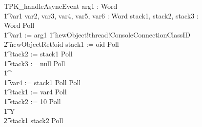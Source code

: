 \begin{figure}[tp!]
  \centering
  \setlength{\zedtab}{0.5cm}
  \setlength{\zedindent}{0pt}
  \setlength{\zedleftsep}{0pt}
  \setlength{\abovedisplayskip}{0pt}
  \setlength{\belowdisplayskip}{0pt}
  \setlength{\abovedisplayshortskip}{0pt}
  \setlength{\belowdisplayshortskip}{0pt}
  \begin{circusaction}
    TPK\_handleAsyncEvent \circdef \circval arg1 : Word \circspot \\
    \t1 \circvar var1 var2, var3, var4, var5, var6 : Word \circspot \circvar stack1, stack2, stack3 : Word \circspot Poll \circseq \\
    \t1 var1 := arg1
    \t1 newObject!thread!ConsoleConnectionClassID \\
    \t2 {} \then  newObjectRet!oid \then stack1 := oid \circseq Poll \circseq \\
    \t1 stack2 := stack1 \circseq Poll \circseq \\
    \t1 stack3 := null \circseq Poll \circseq \\
    \t1 {} \cdots {} \\
    \t1 var4 := stack1 \circseq Poll \circseq Poll \circseq \\
    \t1 stack1 := var4 \circseq Poll \circseq \\
    \t1 stack2 := 10 \circseq Poll \circseq \\
    \t1 \circmu Y \circspot \\
    \t2 \circif stack1 \leq stack2 \circthen Poll \circseq \\

\end{circusaction}
\end{figure}

